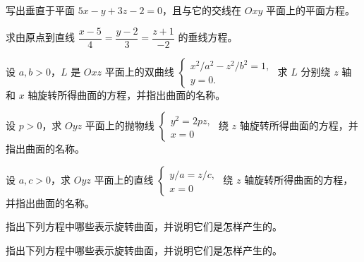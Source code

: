 \noindent\begin{minipage}{\textwidth}
写出垂直于平面 $5x-y+3z-2=0$，且与它的交线在 $Oxy$ 平面上的平面方程。
\end{minipage}\par\vfill
\noindent\begin{minipage}{\textwidth}
求由原点到直线 $\dfrac{x-5}{4}=\dfrac{y-2}{3}=\dfrac{z+1}{-2}$ 的垂线方程。
\end{minipage}\par\vfill
\newpage
\noindent\begin{minipage}{\textwidth}
设 $a,b>0$，$L$ 是 $Oxz$ 平面上的双曲线 $\begin{cases}x^2/a^2-z^2/b^2=1,\\y=0.\end{cases}$ 求 $L$ 分别绕 $z$ 轴和 $x$ 轴旋转所得曲面的方程，并指出曲面的名称。
\end{minipage}\par\vfill
\noindent\begin{minipage}{\textwidth}
设 $p>0$，求 $Oyz$ 平面上的抛物线 $\begin{cases}y^2=2pz,\\x=0\end{cases}$ 绕 $z$ 轴旋转所得曲面的方程，并指出曲面的名称。
\end{minipage}\par\vfill
\noindent\begin{minipage}{\textwidth}
设 $a,c>0$，求 $Oyz$ 平面上的直线 $\begin{cases}y/a=z/c,\\x=0\end{cases}$ 绕 $z$ 轴旋转所得曲面的方程，并指出曲面的名称。
\end{minipage}\par\vfill
\noindent\begin{minipage}{\textwidth}
指出下列方程中哪些表示旋转曲面，并说明它们是怎样产生的。
\end{minipage}\par\vfill
\newpage
\noindent\begin{minipage}{\textwidth}
指出下列方程中哪些表示旋转曲面，并说明它们是怎样产生的。
\end{minipage}\par\vfill

